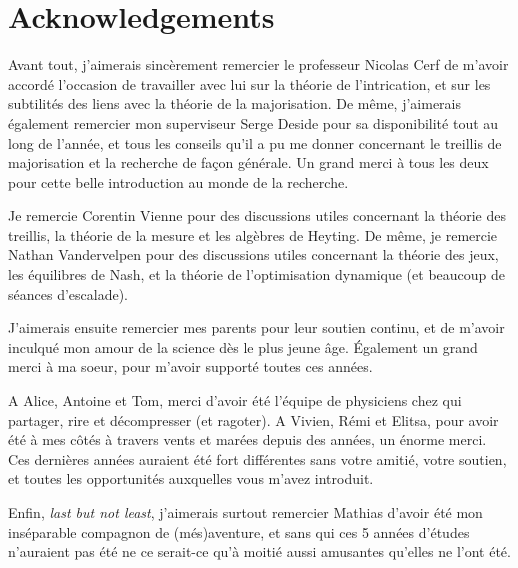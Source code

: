\section*{Acknowledgements}

Avant tout, j'aimerais sincèrement remercier le professeur Nicolas Cerf de m'avoir accordé l'occasion de travailler avec lui sur la théorie de l'intrication, et sur les subtilités des liens avec la théorie de la majorisation. De même, j'aimerais également remercier mon superviseur Serge Deside pour sa disponibilité tout au long de l'année, et tous les conseils qu'il a pu me donner concernant le treillis de majorisation et la recherche de façon générale. Un grand merci à tous les deux pour cette belle introduction au monde de la recherche.

Je remercie Corentin Vienne pour des discussions utiles concernant la théorie des treillis, la théorie de la mesure et les algèbres de Heyting. De même, je remercie Nathan Vandervelpen pour des discussions utiles concernant la théorie des jeux, les équilibres de Nash, et la théorie de l'optimisation dynamique (et beaucoup de séances d'escalade).

J'aimerais ensuite remercier mes parents pour leur soutien continu, et de m'avoir inculqué mon amour de la science dès le plus jeune âge. \'Egalement un grand merci à ma soeur, pour m'avoir supporté toutes ces années.

A Alice, Antoine et Tom, merci d'avoir été l'équipe de physiciens chez qui partager, rire et décompresser (et ragoter). A Vivien, Rémi et Elitsa, pour avoir été à mes côtés à travers vents et marées depuis des années, un énorme merci. Ces dernières années auraient été fort différentes sans votre amitié, votre soutien, et toutes les opportunités auxquelles vous m'avez introduit.

Enfin, \textit{last but not least}, j'aimerais surtout remercier Mathias d'avoir été mon inséparable compagnon de (més)aventure, et sans qui ces 5 années d'études n'auraient pas été ne ce serait-ce qu'à moitié aussi amusantes qu'elles ne l'ont été.

